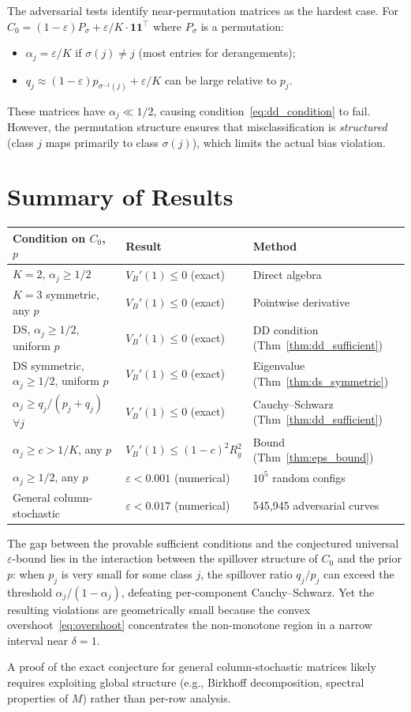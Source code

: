 \documentclass[11pt]{article}
\begin{document}
The adversarial tests identify near-permutation matrices as the hardest case.
For $C_0 = (1-\varepsilon)P_\sigma + \varepsilon/K\cdot\mathbf{1}\mathbf{1}^\top$
where $P_\sigma$ is a permutation:
\begin{itemize}
\item $\alpha_j = \varepsilon/K$ if $\sigma(j) \neq j$ (most entries for derangements);
\item $q_j \approx (1-\varepsilon)p_{\sigma^{-1}(j)} + \varepsilon/K$ can be large relative to $p_j$.
\end{itemize}
These matrices have $\alpha_j \ll 1/2$, causing condition~\eqref{eq:dd_condition} to fail.
However, the permutation structure ensures that misclassification is \emph{structured}
(class $j$ maps primarily to class $\sigma(j)$), which limits the actual bias violation.

\section{Summary of Results}

\begin{center}
\begin{tabular}{lll}
\hline
\textbf{Condition on $C_0$, $p$} & \textbf{Result} & \textbf{Method} \\
\hline
$K=2$, $\alpha_j \geq 1/2$ & $V_B'(1) \leq 0$ (exact) & Direct algebra \\
$K=3$ symmetric, any $p$ & $V_B'(1) \leq 0$ (exact) & Pointwise derivative \\
DS, $\alpha_j \geq 1/2$, uniform $p$ & $V_B'(1) \leq 0$ (exact) & DD condition (Thm~\ref{thm:dd_sufficient}) \\
DS symmetric, $\alpha_j \geq 1/2$, uniform $p$ & $V_B'(1) \leq 0$ (exact) & Eigenvalue (Thm~\ref{thm:ds_symmetric}) \\
$\alpha_j \geq q_j/(p_j+q_j)$ $\forall j$ & $V_B'(1) \leq 0$ (exact) & Cauchy--Schwarz (Thm~\ref{thm:dd_sufficient}) \\
$\alpha_j \geq c > 1/K$, any $p$ & $V_B'(1) \leq (1{-}c)^2 R_g^2$ & Bound (Thm~\ref{thm:eps_bound}) \\
$\alpha_j \geq 1/2$, any $p$ & $\varepsilon < 0.001$ (numerical) & $10^5$ random configs \\
General column-stochastic & $\varepsilon < 0.017$ (numerical) & 545{,}945 adversarial curves \\
\hline
\end{tabular}
\end{center}

The gap between the provable sufficient conditions and the conjectured universal $\varepsilon$-bound
lies in the interaction between the spillover structure of $C_0$ and the prior $p$:
when $p_j$ is very small for some class $j$, the spillover ratio $q_j/p_j$ can exceed
the threshold $\alpha_j/(1-\alpha_j)$, defeating per-component Cauchy--Schwarz.
Yet the resulting violations are geometrically small because the convex overshoot~\eqref{eq:overshoot}
concentrates the non-monotone region in a narrow interval near $\delta = 1$.

A proof of the exact conjecture for general column-stochastic matrices likely requires
exploiting global structure (e.g., Birkhoff decomposition, spectral properties of $M$)
rather than per-row analysis.
\end{document}
